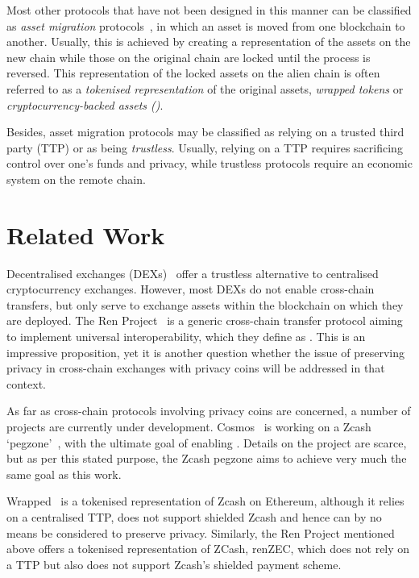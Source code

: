 Most other protocols that have not been designed in this manner can be classified as \emph{asset migration} protocols~\cite{zamyatin2019sok}, in which an asset is moved from one blockchain to another.
Usually, this is achieved by creating a representation of the assets on the new chain while those on the original chain are locked until the process is reversed.
This representation of the locked assets on the alien chain is often referred to as a \emph{tokenised representation} of the original assets, \emph{wrapped tokens} or \emph{cryptocurrency-backed assets (\cbas)}.

Besides, asset migration protocols may be classified as relying on a trusted third party (TTP) or as being \emph{trustless}.
Usually, relying on a TTP requires sacrificing control over one's funds and privacy, while trustless protocols require an economic system on the remote chain.


\section{Related Work}
Decentralised exchanges (DEXs)~\cite{0xwhitepaper,uniswap} offer a trustless alternative to centralised cryptocurrency exchanges.
However, most DEXs do not enable cross-chain transfers, but only serve to exchange assets within the blockchain on which they are deployed.
The Ren Project~\cite{HomerenprojectrenWikiGitHub} is a generic cross-chain transfer protocol aiming to implement universal interoperability, which they define as .
This is an impressive proposition, yet it is another question whether the issue of preserving privacy in cross-chain exchanges with privacy coins will be addressed in that context.

As far as cross-chain protocols involving privacy coins are concerned, a number of projects are currently under development.
Cosmos~\cite{cosmosWhitepaper} is working on a Zcash `pegzone'~\cite{githubPegzone}, with the ultimate goal of enabling .
Details on the project are scarce, but as per this stated purpose, the Zcash pegzone aims to achieve very much the same goal as this work.

Wrapped~\cite{Wrapped} is a tokenised representation of Zcash on Ethereum, although it relies on a centralised TTP, does not support shielded Zcash and hence can by no means be considered to preserve privacy.
Similarly, the Ren Project mentioned above offers a tokenised representation of ZCash, renZEC, which does not rely on a TTP but also does not support Zcash's shielded payment scheme.

